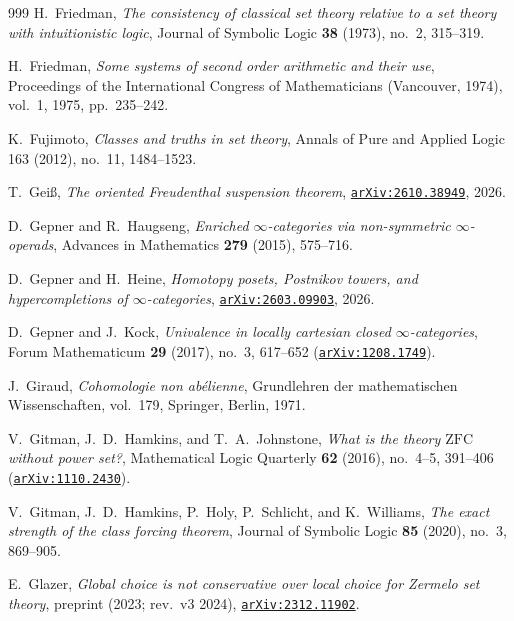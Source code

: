 \documentclass[10pt,twoside,openright]{book}
\theoremstyle{crmplain}
\theoremstyle{crmdef}
\theoremstyle{crmremark}
\begin{document}
\begin{thebibliography}{999}
H.~Friedman,
\emph{The consistency of classical set theory relative to a set theory with intuitionistic logic},
Journal of Symbolic Logic \textbf{38} (1973), no.~2, 315--319.

H.~Friedman,
\emph{Some systems of second order arithmetic and their use},
Proceedings of the International Congress of Mathematicians (Vancouver, 1974), vol.~1, 1975, pp.~235--242.

K.~Fujimoto,
\emph{Classes and truths in set theory},
Annals of Pure and Applied Logic 163 (2012), no.~11, 1484--1523.

T.~Gei\ss,
\emph{The oriented Freudenthal suspension theorem},
\href{https://arxiv.org/abs/2610.38949}{\texttt{arXiv:2610.38949}}, 2026.

D.~Gepner and R.~Haugseng,
\emph{Enriched $\infty$-categories via non-symmetric $\infty$-operads},
Advances in Mathematics \textbf{279} (2015), 575--716.

D.~Gepner and H.~Heine,
\emph{Homotopy posets, Postnikov towers, and hypercompletions of $\infty$-categories},
\href{https://arxiv.org/abs/2603.09903}{\texttt{arXiv:2603.09903}}, 2026.

D.~Gepner and J.~Kock,
\emph{Univalence in locally cartesian closed $\infty$-categories},
Forum Mathematicum \textbf{29} (2017), no.~3, 617--652 (\href{https://arxiv.org/abs/1208.1749}{\texttt{arXiv:1208.1749}}).

J.~Giraud,
\emph{Cohomologie non ab\'elienne},
Grundlehren der mathematischen Wissenschaften, vol.~179, Springer, Berlin, 1971.

V.~Gitman, J.~D.~Hamkins, and T.~A.~Johnstone,
\emph{What is the theory $\mathrm{ZFC}$ without power set?},
Mathematical Logic Quarterly \textbf{62} (2016), no.~4--5, 391--406 (\href{https://arxiv.org/abs/1110.2430}{\texttt{arXiv:1110.2430}}).

V.~Gitman, J.~D.~Hamkins, P.~Holy, P.~Schlicht, and K.~Williams,
\emph{The exact strength of the class forcing theorem},
Journal of Symbolic Logic \textbf{85} (2020), no.~3, 869--905.

E.~Glazer,
\emph{Global choice is not conservative over local choice for Zermelo set theory},
preprint (2023; rev.\ v3 2024), \href{https://arxiv.org/abs/2312.11902}{\texttt{arXiv:2312.11902}}.


\end{thebibliography}
\end{document}
